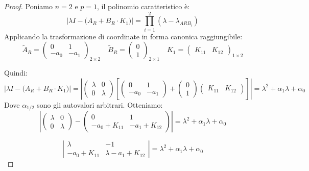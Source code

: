 \documentclass{report}
\theoremstyle{nostyle}
\begin{document}
\begin{proof}
\noindent Poniamo $n = 2$ e $p = 1$, il polinomio caratteristico è:
\[    \bigg|    \lambda I -\big(  A_R + B_R\cdot K_1  \big)     \bigg| = \prod_{i = 1}^{2} (\lambda - \lambda_{ARB_i})     \]
Applicando la trasformazione di coordinate in forma canonica raggiungibile:
\[       \widetilde{A}_R = \begin{pmatrix}
    0 & 1 \\ -a_0 & -a_1
\end{pmatrix}_{2 \times 2}   \quad \widetilde{B}_R  = \begin{pmatrix}
    0 \\ 1
\end{pmatrix}_{2\times 1}  \quad K_1 = \begin{pmatrix}
    K_{11} & K_{12}
\end{pmatrix}_{1\times 2}     \]

\noindent Quindi:
\[      \bigg|    \lambda I -\big(  A_R + B_R\cdot K_1  \big)     \bigg| = \left|     \begin{pmatrix}
    \lambda & 0 \\ 0 & \lambda 
\end{pmatrix}     \left[        \begin{pmatrix}
    0 & 1 \\ -a_0 & -a_1
\end{pmatrix}       + \begin{pmatrix}
    0 \\ 1 
\end{pmatrix} \begin{pmatrix}
    K_{11} & K_{12}
\end{pmatrix}            \right]  \right| = \lambda ^2 + \alpha_1 \lambda + \alpha_0          \]
Dove $\alpha_{1/2}$ sono gli autovalori arbitrari. Otteniamo:
\[        \left|     \begin{pmatrix}
    \lambda & 0 \\ 0 & \lambda 
\end{pmatrix}    -        \begin{pmatrix}
    0 & 1 \\ -a_0 + K_{11} & -a_1 + K_{12}
\end{pmatrix}      \right|         =    \lambda ^2 + \alpha_1 \lambda + \alpha_0     \]

\[  \left|
\begin{matrix}
    \lambda & -1 \\ -a_0 + K_{11} & \lambda -a_1 + K_{12}
\end{matrix}      \right|         =    \lambda ^2 + \alpha_1 \lambda + \alpha_0        \]


\end{proof}
\end{document}
